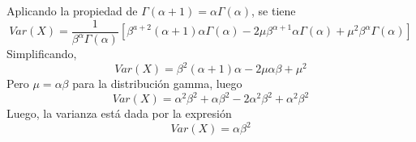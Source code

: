 \documentclass[12pt]{article}
\begin{document}
          Aplicando la propiedad de $\Gamma(\alpha+1)=\alpha\Gamma(\alpha)$, se tiene
          \begin{equation*}
            Var\left( X \right)=\frac{1}{\beta ^{\alpha }\Gamma\left( \alpha  \right)}\left[ \beta ^{a+2}\left( \alpha +1 \right)\alpha \Gamma\left( \alpha  \right)-2\mu \beta ^{\alpha +1}\alpha \Gamma\left( \alpha  \right)+\mu ^{2}\beta ^{\alpha }\Gamma\left( \alpha  \right) \right]
          \end{equation*}
          Simplificando,
          \begin{equation*}
            Var\left( X \right)=\beta ^{2}\left( \alpha +1 \right)\alpha -2\mu \alpha \beta +\mu ^{2}
          \end{equation*}
          Pero $\mu=\alpha\beta$ para la distribución gamma, luego
          \begin{equation*}
            Var\left( X \right)=\alpha ^{2}\beta ^{2}+\alpha \beta ^{2}-2\alpha ^{2}\beta ^{2}+\alpha ^{2}\beta ^{2}
          \end{equation*}
          Luego, la varianza está dada por la expresión
          \begin{equation}
            Var\left( X \right)=\alpha\beta^2
          \end{equation}
          
\end{document}
